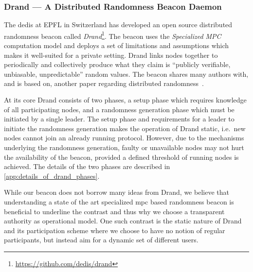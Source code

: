 \subsubsection{Drand --- A Distributed Randomness Beacon Daemon}%
\label{sub:drand_a_distributed_randomness_beacon_daemon}
The \gls{dedis} at EPFL in Switzerland has developed an open source distributed randomness beacon called \textit{Drand}\footnote{\url{https://github.com/dedis/drand}}.
The beacon uses the \textit{Specialized MPC} computation model and deploys a set of limitations and assumptions which makes it well-suited for a private setting.
Drand links nodes together to periodically and collectively produce what they claim is \enquote{publicly verifiable, unbiasable, unpredictable} random values.
The beacon shares many authors with, and is based on, another paper regarding distributed randomness~\cite{syta2017scalable}.

At its core Drand consists of two phases, a setup phase which requires knowledge of all participating nodes, and a randomness generation phase which must be initiated by a single leader.
The setup phase and requirements for a leader to initiate the randomness generation makes the operation of Drand static, i.e.\ new nodes cannot join an already running protocol.
However, due to the mechanisms underlying the randomness generation, faulty or unavailable nodes may not hurt the availability of the beacon, provided a defined threshold of running nodes is achieved.
The details of the two phases are described in \vref{app:details_of_drand_phases}.

While our beacon does not borrow many ideas from Drand, we believe that understanding a state of the art specialized \gls{mpc} based randomness beacon is beneficial to underline the contrast and thus why we choose a transparent authority as operational model.
One such contrast is the static nature of Drand and its participation scheme where we choose to have no notion of regular participants, but instead aim for a dynamic set of different users.

